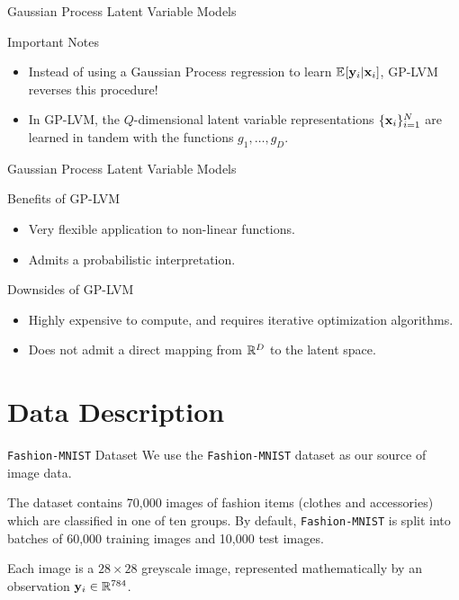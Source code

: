 \documentclass[dvipsnames]{beamer}
\newcommand{\FMNIST}{\texttt{Fashion-MNIST}}
\begin{document}
\begin{frame}{Gaussian Process Latent Variable Models}
    \begin{alertblock}{Important Notes}
        \begin{itemize}[label=]
            \item Instead of using a Gaussian Process regression to learn $\expec{\bfy_{i} \vert \bfx_{i}}$, GP-LVM reverses this procedure!
            \item In GP-LVM, the $Q$-dimensional latent variable representations $\{\mathbf{x}_{i}\}_{i=1}^{N}$ are learned in tandem with the functions $g_{1}, \dots, g_{D}$.
        \end{itemize}
    \end{alertblock}
\end{frame}

\begin{frame}{Gaussian Process Latent Variable Models}
    \begin{exampleblock}{Benefits of GP-LVM}
        \begin{itemize}[label=]
            \item Very flexible application to non-linear functions.
            \item Admits a probabilistic interpretation.
        \end{itemize}
    \end{exampleblock}

    \bigskip

    \begin{alertblock}{Downsides of GP-LVM}
        \begin{itemize}[label=]
            \item Highly expensive to compute, and requires iterative optimization algorithms.
            \item Does not admit a direct mapping from $\mathbb{R}^{D}$ to the latent space. 
        \end{itemize}
    \end{alertblock}
\end{frame}

\section{Data Description}
\begin{frame}{\FMNIST{} Dataset}
    We use the \FMNIST{} dataset \citep{Fashion-MNIST} as our source of image data.

    \bigskip

    The dataset contains 70,000 images of fashion items (clothes and accessories) which are classified in one of ten groups. By default, \FMNIST{} is split into batches of 60,000 training images and 10,000 test images. 

    \bigskip

    Each image is a $28 \times 28$ greyscale image, represented mathematically by an observation $\mathbf{y}_{i} \in \mathbb{R}^{784}$.


\end{frame}
\end{document}
